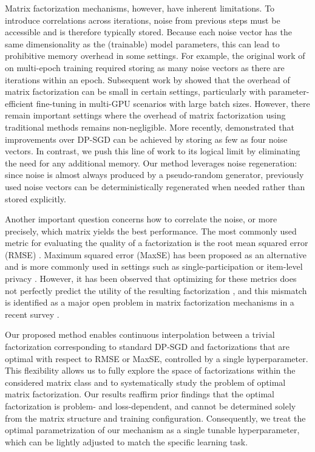 \documentclass{article}
\theoremstyle{plain}
\theoremstyle{definition}
\theoremstyle{remark}
\begin{document}
Matrix factorization mechanisms, however, have inherent limitations. To introduce correlations across iterations, noise from previous steps must be accessible and is therefore typically stored. Because each noise vector has the same dimensionality as the (trainable) model parameters, this can lead to prohibitive memory overhead in some settings. For example, the original work of \citet{choquette2022multi} on multi-epoch training required storing as many noise vectors as there are iterations within an epoch. Subsequent work by \citet{scalingmckenna2024} showed that the overhead of matrix factorization can be small in certain settings, particularly with parameter-efficient fine-tuning in multi-GPU scenarios with large batch sizes. However, there remain important settings where the overhead of matrix factorization using traditional methods remains non-negligible. More recently, \citet{kalinin2025back} demonstrated that improvements over DP-SGD can be achieved by storing as few as four noise vectors. In contrast, we push this line of work to its logical limit by eliminating the need for any additional memory. Our method leverages noise regeneration: since noise is almost always produced by a pseudo-random generator, previously used noise vectors can be deterministically regenerated when needed rather than stored explicitly.

Another important question concerns how to correlate the noise, or more precisely, which matrix yields the best performance. The most commonly used metric for evaluating the quality of a factorization is the root mean squared error (RMSE) \citep{Denisov, choquette2022multi, scalingmckenna2024, kalinin2025back}. Maximum squared error (MaxSE) has been proposed as an alternative and is more commonly used in settings such as single-participation or item-level privacy \citep{henzinger2023almost, henzinger2025improved, henzinger2025normalized, andersson2024streaming}. However, it has been observed that optimizing for these metrics does not perfectly predict the utility of the resulting factorization \citep{kalinin2024, kalinin2025back}, and this mismatch is identified as a major open problem in matrix factorization mechanisms in a recent survey \citep{pillutla2025correlated}.

Our proposed method enables continuous interpolation between a trivial factorization corresponding to standard DP-SGD and factorizations that are optimal with respect to RMSE or MaxSE, controlled by a single hyperparameter. This flexibility allows us to fully explore the space of factorizations within the considered matrix class and to systematically study the problem of optimal matrix factorization. Our results reaffirm prior findings \citep{koloskova2023gradient, choquette2023correlated, gu2025correlating} that the optimal factorization is problem- and loss-dependent, and cannot be determined solely from the matrix structure and training configuration. Consequently, we treat the optimal parametrization of our mechanism as a single tunable hyperparameter, which can be lightly adjusted to match the specific learning task.
\end{document}
